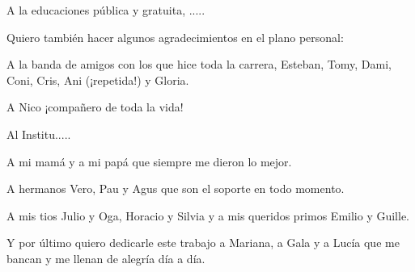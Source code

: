 A la educaciones pública y gratuita, ..... \bigskip


Quiero también hacer algunos agradecimientos en el plano personal: 

A la banda de amigos con los que hice toda la carrera, Esteban, Tomy, Dami, Coni, Cris, Ani (¡repetida!) y Gloria.\bigskip

A Nico ¡compañero de toda la vida! \bigskip

Al Institu.....\bigskip 

A mi mamá y a mi papá que siempre me dieron lo mejor.\bigskip

A hermanos Vero, Pau y Agus que son el soporte en todo momento. \bigskip

A mis tios Julio y Oga, Horacio y Silvia y a mis queridos primos Emilio y Guille.\bigskip

Y por último quiero dedicarle este trabajo a Mariana, a Gala y a Lucía que me bancan y me llenan de alegría día a día.














\cleardoublepage